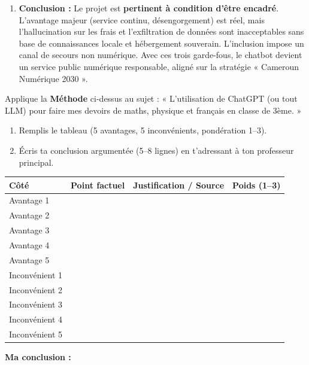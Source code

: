 \documentclass[11pt]{article}
\begin{document}
\begin{exoresolu}
\begin{enumerate}
\begin{enumerate}
        \item \textbf{Canal alternatif inclusif :} maintenir un standard téléphonique humain (USSD/menu vocal) et un affichage physique au secrétariat pour les non-connectés.
    \end{enumerate}
    \item \textbf{Conclusion :} Le projet est \textbf{pertinent à condition d'être encadré}. L'avantage majeur (service continu, désengorgement) est réel, mais l'hallucination sur les frais et l'exfiltration de données sont inacceptables sans base de connaissances locale et hébergement souverain. L'inclusion impose un canal de secours non numérique. Avec ces trois garde-fous, le chatbot devient un service public numérique responsable, aligné sur la stratégie « Cameroun Numérique 2030 ».
\end{enumerate}
\end{exoresolu}

\begin{exercice}
Applique la \textbf{Méthode} ci-dessus au sujet : « L'utilisation de ChatGPT (ou tout LLM) pour faire mes devoirs de maths, physique et français en classe de 3ème. »
\begin{enumerate}
    \item Remplis le tableau (5 avantages, 5 inconvénients, pondération 1–3).
    \item Écris ta conclusion argumentée (5–8 lignes) en t'adressant à ton professeur principal.
\end{enumerate}
\begin{center}
\begin{tabularx}{\linewidth}{|l|X|X|c|}
\hline
\textbf{Côté} & \textbf{Point factuel} & \textbf{Justification / Source} & \textbf{Poids (1–3)} \\
\hline
Avantage 1 & & & \\
Avantage 2 & & & \\
Avantage 3 & & & \\
Avantage 4 & & & \\
Avantage 5 & & & \\
\hline
Inconvénient 1 & & & \\
Inconvénient 2 & & & \\
Inconvénient 3 & & & \\
Inconvénient 4 & & & \\
Inconvénient 5 & & & \\
\hline
\end{tabularx}
\end{center}
\vspace{0.5cm}
\textbf{Ma conclusion :} \dotfill
\end{exercice}
\end{document}

